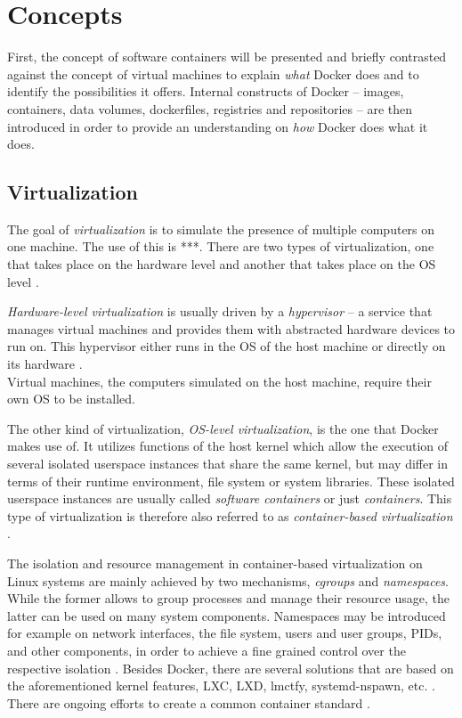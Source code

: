 
\section{Concepts} %
\label{sec:docker_concepts}

  First, the concept of software containers will be presented and briefly contrasted against the concept of virtual machines to explain \emph{what} Docker does and to identify the possibilities it offers. Internal constructs of Docker -- images, containers, data volumes, dockerfiles, registries and repositories -- are then introduced in order to provide an understanding on \emph{how} Docker does what it does.

  \subsection{Virtualization} %
  \label{sub:virtualization_and_software_containers}
    The goal of \emph{virtualization} is to simulate the presence of multiple computers on one machine. The use of this is ***. There are two types of virtualization, one that takes place on the hardware level and another that takes place on the \ac{OS} level \cite{Ruiz2015Performance}.

    \emph{Hardware-level virtualization} is usually driven by a \emph{hypervisor} -- a service that manages virtual machines and provides them with abstracted hardware devices to run on. This hypervisor either runs in the OS of the host machine or directly on its hardware \cite{Ruiz2015Performance}. \\
    Virtual machines, \ie the computers simulated on the host machine, require their own OS to be installed.

    The other kind of virtualization, \emph{OS-level virtualization}, is the one that Docker makes use of.
    It utilizes functions of the host kernel which allow the execution of several isolated userspace instances that share the same kernel, but may differ in terms of their runtime environment, \eg file system or system libraries. These isolated userspace instances are usually called \emph{software containers} or just \emph{containers}. This type of virtualization is therefore also referred to as \emph{container-based virtualization} \cite{Ruiz2015Performance}.

    The isolation and resource management in container-based virtualization on Linux systems are mainly achieved by two mechanisms, \emph{\ac{cgroups}} and \emph{namespaces}. While the former allows to group processes and manage their resource usage, the latter can be used on many system components. Namespaces may be introduced for example on network interfaces, the file system, users and user groups, \acp{PID}, and other components, in order to achieve a fine grained control over the respective isolation \cite{Ruiz2015Performance}.
    Besides Docker, there are several solutions that are based on the aforementioned kernel features, \eg LXC, LXD, lmctfy, systemd-nspawn, etc. \cite{Ruiz2015Performance}. There are ongoing efforts to create a common container standard \cite{Initiative????Open}.


